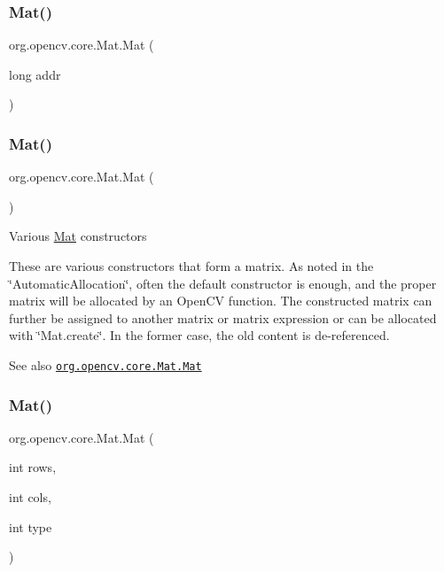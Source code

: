 \subsubsection{\texorpdfstring{Mat()}{Mat()}\hspace{0.1cm}{\footnotesize\ttfamily [1/9]}}
{\footnotesize\ttfamily org.\+opencv.\+core.\+Mat.\+Mat (\begin{DoxyParamCaption}\item[{long}]{addr }\end{DoxyParamCaption})}

\mbox{\label{classorg_1_1opencv_1_1core_1_1_mat_aa03d10c0ff4945578646472c11ab3811}} 
\subsubsection{\texorpdfstring{Mat()}{Mat()}\hspace{0.1cm}{\footnotesize\ttfamily [2/9]}}
{\footnotesize\ttfamily org.\+opencv.\+core.\+Mat.\+Mat (\begin{DoxyParamCaption}{ }\end{DoxyParamCaption})}

Various \mbox{\hyperlink{classorg_1_1opencv_1_1core_1_1_mat}{Mat}} constructors

These are various constructors that form a matrix. As noted in the \char`\"{}\+Automatic\+Allocation\char`\"{}, often the default constructor is enough, and the proper matrix will be allocated by an Open\+CV function. The constructed matrix can further be assigned to another matrix or matrix expression or can be allocated with \char`\"{}\+Mat.\+create\char`\"{}. In the former case, the old content is de-\/referenced.

\begin{DoxySeeAlso}{See also}
\href{http://docs.opencv.org/modules/core/doc/basic_structures.html#mat-mat}{\tt org.\+opencv.\+core.\+Mat.\+Mat} 
\end{DoxySeeAlso}
\mbox{\label{classorg_1_1opencv_1_1core_1_1_mat_ac10e0831f257b5f95040cf2855b11954}} 
\subsubsection{\texorpdfstring{Mat()}{Mat()}\hspace{0.1cm}{\footnotesize\ttfamily [3/9]}}
{\footnotesize\ttfamily org.\+opencv.\+core.\+Mat.\+Mat (\begin{DoxyParamCaption}\item[{int}]{rows,  }\item[{int}]{cols,  }\item[{int}]{type }\end{DoxyParamCaption})}

